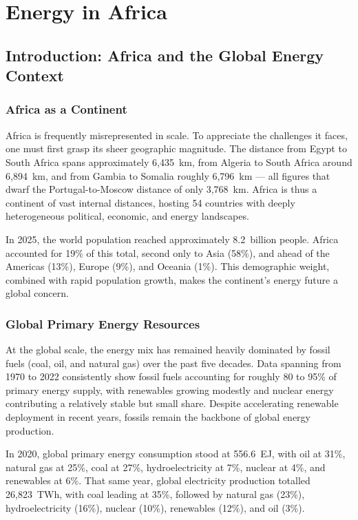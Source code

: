 \chapter{Energy in Africa}


\section{Introduction: Africa and the Global Energy Context}

\subsection{Africa as a Continent}

Africa is frequently misrepresented in scale. To appreciate the challenges it faces, one must first grasp its sheer geographic magnitude. The distance from Egypt to South Africa spans approximately 6{,}435~km, from Algeria to South Africa around 6{,}894~km, and from Gambia to Somalia roughly 6{,}796~km — all figures that dwarf the Portugal-to-Moscow distance of only 3{,}768~km. Africa is thus a continent of vast internal distances, hosting 54 countries with deeply heterogeneous political, economic, and energy landscapes.

In 2025, the world population reached approximately 8.2~billion people. Africa accounted for 19\% of this total, second only to Asia (58\%), and ahead of the Americas (13\%), Europe (9\%), and Oceania (1\%). This demographic weight, combined with rapid population growth, makes the continent's energy future a global concern.

\subsection{Global Primary Energy Resources}

At the global scale, the energy mix has remained heavily dominated by fossil fuels (coal, oil, and natural gas) over the past five decades. Data spanning from 1970 to 2022 consistently show fossil fuels accounting for roughly 80 to 95\% of primary energy supply, with renewables growing modestly and nuclear energy contributing a relatively stable but small share. Despite accelerating renewable deployment in recent years, fossils remain the backbone of global energy production.

In 2020, global primary energy consumption stood at 556.6~EJ, with oil at 31\%, natural gas at 25\%, coal at 27\%, hydroelectricity at 7\%, nuclear at 4\%, and renewables at 6\%. That same year, global electricity production totalled 26{,}823~TWh, with coal leading at 35\%, followed by natural gas (23\%), hydroelectricity (16\%), nuclear (10\%), renewables (12\%), and oil (3\%).

